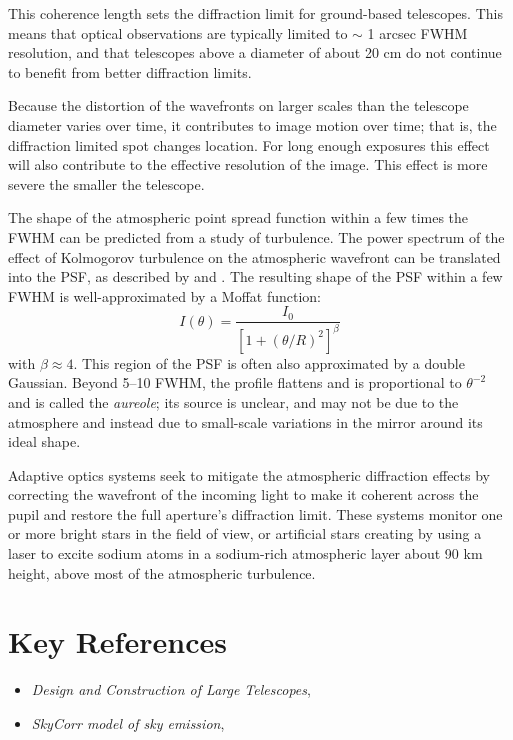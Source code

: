 This coherence length sets the diffraction limit for ground-based
telescopes. This means that optical observations are typically limited
to $\sim$ 1 arcsec FWHM resolution, and that telescopes above a
diameter of about 20 cm do not continue to benefit from better
diffraction limits.

Because the distortion of the wavefronts on larger scales than the
telescope diameter varies over time, it contributes to image motion
over time; that is, the diffraction limited spot changes location. For
long enough exposures this effect will also contribute to the
effective resolution of the image. This effect is more severe the
smaller the telescope.

The shape of the atmospheric point spread function within a few times
the FWHM can be predicted from a study of turbulence. The power
spectrum of the effect of Kolmogorov turbulence on the atmospheric
wavefront can be translated into the PSF, as described
by \citet{fried66a} and \citet{johnson73a}. The resulting shape of the
PSF within a few FWHM is well-approximated by a Moffat function:
\begin{equation}
I(\theta) = \frac{I_0}{\left[1 + \left(\theta /
R\right)^2\right]^\beta}
\end{equation}
with $\beta \approx 4$. This region of the PSF is often also
approximated by a double Gaussian. Beyond 5--10 FWHM, the profile
flattens and is proportional to $\theta^{-2}$ and is called the {\it
aureole}; its source is unclear, and may not be due to the atmosphere
and instead due to small-scale variations in the mirror around its
ideal shape.

Adaptive optics systems seek to mitigate the atmospheric diffraction
effects by correcting the wavefront of the incoming light to make it
coherent across the pupil and restore the full aperture's diffraction
limit. These systems monitor one or more bright stars in the field of
view, or artificial stars creating by using a laser to excite sodium
atoms in a sodium-rich atmospheric layer about 90 km height, above
most of the atmospheric turbulence. 

\section{Key References}

\begin{itemize}
  \item {\it Design and Construction of Large Telescopes},
      \citet{bely03a}
  \item {\it SkyCorr model of sky emission}, \citet{noll14a}
\end{itemize}

